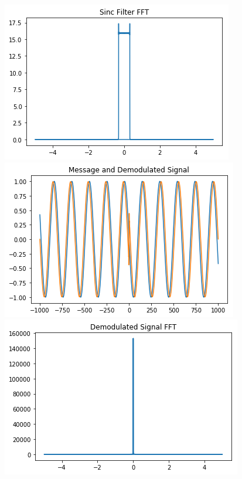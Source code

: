 \documentclass[12pt,a4paper]{article}%
\begin{document}
\begin{flushleft}
\begin{center}
			{\includegraphics[width=0.80 \textwidth]{./images/sinc_fft.PNG}}
			{\includegraphics[width=0.80 \textwidth]{./images/demod.PNG}}\\\bigskip
			{\includegraphics[width=0.80 \textwidth]{./images/demod_fft.PNG}}
		\end{center}
	\end{flushleft}
	\pagebreak
\end{document}
